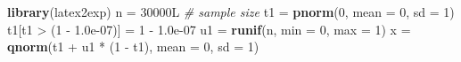 \documentclass[11pt,]{article}
\newenvironment{Shaded}{\begin{snugshade}}{\end{snugshade}}
\newcommand{\KeywordTok}[1]{\textcolor[rgb]{0.13,0.29,0.53}{\textbf{{#1}}}}
\newcommand{\DataTypeTok}[1]{\textcolor[rgb]{0.13,0.29,0.53}{{#1}}}
\newcommand{\DecValTok}[1]{\textcolor[rgb]{0.00,0.00,0.81}{{#1}}}
\newcommand{\FloatTok}[1]{\textcolor[rgb]{0.00,0.00,0.81}{{#1}}}
\newcommand{\StringTok}[1]{\textcolor[rgb]{0.31,0.60,0.02}{{#1}}}
\newcommand{\CommentTok}[1]{\textcolor[rgb]{0.56,0.35,0.01}{\textit{{#1}}}}
\newcommand{\NormalTok}[1]{{#1}}
\begin{document}
\begin{Shaded}
\begin{Highlighting}[]
\KeywordTok{library}\NormalTok{(latex2exp)}
\NormalTok{n =}\StringTok{ }\NormalTok{30000L }\CommentTok{# sample size}
\NormalTok{t1 =}\StringTok{ }\KeywordTok{pnorm}\NormalTok{(}\DecValTok{0}\NormalTok{, }\DataTypeTok{mean =} \DecValTok{0}\NormalTok{, }\DataTypeTok{sd =} \DecValTok{1}\NormalTok{)}
\NormalTok{t1[t1 >}\StringTok{ }\NormalTok{(}\DecValTok{1} \NormalTok{-}\StringTok{ }\FloatTok{1.0e-07}\NormalTok{)] =}\StringTok{ }\DecValTok{1} \NormalTok{-}\StringTok{ }\FloatTok{1.0e-07}
\NormalTok{u1 =}\StringTok{ }\KeywordTok{runif}\NormalTok{(n, }\DataTypeTok{min =} \DecValTok{0}\NormalTok{, }\DataTypeTok{max =} \DecValTok{1}\NormalTok{)}
\NormalTok{x =}\StringTok{ }\KeywordTok{qnorm}\NormalTok{(t1 +}\StringTok{ }\NormalTok{u1 *}\StringTok{ }\NormalTok{(}\DecValTok{1} \NormalTok{-}\StringTok{ }\NormalTok{t1), }\DataTypeTok{mean =} \DecValTok{0}\NormalTok{, }\DataTypeTok{sd =} \DecValTok{1}\NormalTok{)}


\end{Highlighting}
\end{Shaded}
\end{document}

